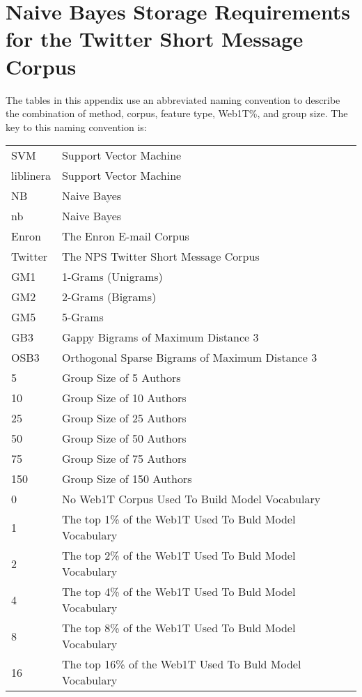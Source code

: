 \chapter{Naive Bayes Storage Requirements for the Twitter Short Message Corpus}

The tables in this appendix use an abbreviated naming convention to describe the combination of method, corpus, feature type, Web1T\%, and group size.  The key to this naming convention is:

\begin{center}
\begin{table}[htbp!]
	\begin{center}
	\begin{tabular}{ll}
	SVM & Support Vector Machine\\
	liblinera & Support Vector Machine\\
	NB & Naive Bayes\\
	nb & Naive Bayes\\
	
	Enron & The Enron E-mail Corpus\\
	Twitter & The NPS Twitter Short Message Corpus\\
	
	GM1 & 1-Grams (Unigrams)\\
	GM2 & 2-Grams (Bigrams)\\
	GM5 & 5-Grams\\
	GB3 & Gappy Bigrams of Maximum Distance 3\\
	OSB3 & Orthogonal Sparse Bigrams of Maximum Distance 3\\
		
	5 & Group Size of 5 Authors\\
	10 & Group Size of 10 Authors\\
	25 & Group Size of 25 Authors\\
	50 & Group Size of 50 Authors\\
	75 & Group Size of 75 Authors\\
	150 & Group Size of 150 Authors\\
	
	0 & No Web1T Corpus Used To Build Model Vocabulary\\
	1 & The top 1\% of the Web1T Used To Buld Model Vocabulary\\
	2 & The top 2\% of the Web1T Used To Buld Model Vocabulary\\
	4 & The top 4\% of the Web1T Used To Buld Model Vocabulary\\
	8 & The top 8\% of the Web1T Used To Buld Model Vocabulary\\
	16 & The top 16\% of the Web1T Used To Buld Model Vocabulary\\
	\end{tabular}
	\end{center}
\end{table}
\end{center}


